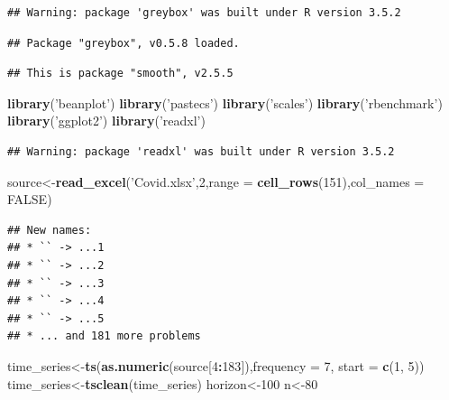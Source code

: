 \documentclass[
]{article}
\newenvironment{Shaded}{\begin{snugshade}}{\end{snugshade}}
\newcommand{\DataTypeTok}[1]{\textcolor[rgb]{0.13,0.29,0.53}{#1}}
\newcommand{\DecValTok}[1]{\textcolor[rgb]{0.00,0.00,0.81}{#1}}
\newcommand{\KeywordTok}[1]{\textcolor[rgb]{0.13,0.29,0.53}{\textbf{#1}}}
\newcommand{\NormalTok}[1]{#1}
\newcommand{\OperatorTok}[1]{\textcolor[rgb]{0.81,0.36,0.00}{\textbf{#1}}}
\newcommand{\OtherTok}[1]{\textcolor[rgb]{0.56,0.35,0.01}{#1}}
\newcommand{\StringTok}[1]{\textcolor[rgb]{0.31,0.60,0.02}{#1}}
\begin{document}
\begin{verbatim}
## Warning: package 'greybox' was built under R version 3.5.2
\end{verbatim}

\begin{verbatim}
## Package "greybox", v0.5.8 loaded.
\end{verbatim}

\begin{verbatim}
## This is package "smooth", v2.5.5
\end{verbatim}

\begin{Shaded}
\begin{Highlighting}[]
\KeywordTok{library}\NormalTok{(}\StringTok{'beanplot'}\NormalTok{)}
\KeywordTok{library}\NormalTok{(}\StringTok{'pastecs'}\NormalTok{)}
\KeywordTok{library}\NormalTok{(}\StringTok{'scales'}\NormalTok{)}
\KeywordTok{library}\NormalTok{(}\StringTok{'rbenchmark'}\NormalTok{)}
\KeywordTok{library}\NormalTok{(}\StringTok{'ggplot2'}\NormalTok{)}
\KeywordTok{library}\NormalTok{(}\StringTok{'readxl'}\NormalTok{)}
\end{Highlighting}
\end{Shaded}

\begin{verbatim}
## Warning: package 'readxl' was built under R version 3.5.2
\end{verbatim}

\begin{Shaded}
\begin{Highlighting}[]
\NormalTok{source<-}\KeywordTok{read_excel}\NormalTok{(}\StringTok{'Covid.xlsx'}\NormalTok{,}\DecValTok{2}\NormalTok{,}\DataTypeTok{range =} \KeywordTok{cell_rows}\NormalTok{(}\DecValTok{151}\NormalTok{),}\DataTypeTok{col_names =} \OtherTok{FALSE}\NormalTok{)}
\end{Highlighting}
\end{Shaded}

\begin{verbatim}
## New names:
## * `` -> ...1
## * `` -> ...2
## * `` -> ...3
## * `` -> ...4
## * `` -> ...5
## * ... and 181 more problems
\end{verbatim}

\begin{Shaded}
\begin{Highlighting}[]
\NormalTok{time_series<-}\KeywordTok{ts}\NormalTok{(}\KeywordTok{as.numeric}\NormalTok{(source[}\DecValTok{4}\OperatorTok{:}\DecValTok{183}\NormalTok{]),}\DataTypeTok{frequency =} \DecValTok{7}\NormalTok{, }\DataTypeTok{start =} \KeywordTok{c}\NormalTok{(}\DecValTok{1}\NormalTok{, }\DecValTok{5}\NormalTok{))}
\NormalTok{time_series<-}\KeywordTok{tsclean}\NormalTok{(time_series)}
\NormalTok{horizon<-}\DecValTok{100}
\NormalTok{n<-}\DecValTok{80}
\end{Highlighting}
\end{Shaded}
\end{document}
